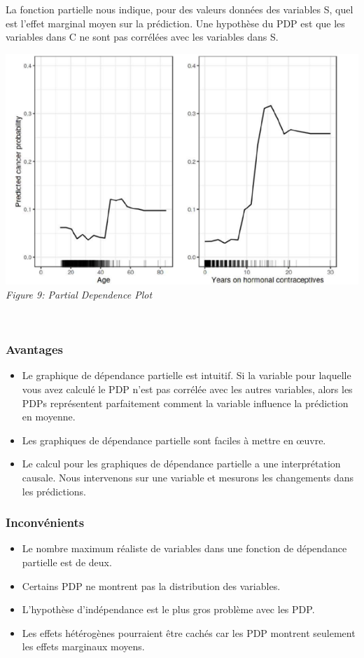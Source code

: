 La fonction partielle nous indique, pour des valeurs données des variables S, quel est l'effet marginal moyen sur la prédiction. Une hypothèse du PDP est que les variables dans C ne sont pas corrélées avec les variables dans S.


\begin{center}
    \centering
    \includegraphics[width=0.7\linewidth]{Images/PDP.png}
    \\
    \emph{Figure 9: Partial Dependence Plot}
    \\
\end{center}
\\

\subsubsection{Avantages}
\begin{itemize}
    \item Le graphique de dépendance partielle est intuitif. Si la variable pour laquelle vous avez calculé le PDP n'est pas corrélée avec les autres variables, alors les PDPs représentent parfaitement comment la variable influence la prédiction en moyenne.
    \item Les graphiques de dépendance partielle sont faciles à mettre en œuvre.
    \item Le calcul pour les graphiques de dépendance partielle a une interprétation causale. Nous intervenons sur une variable et mesurons les changements dans les prédictions.
\end{itemize}

\subsubsection{Inconvénients}
\begin{itemize}
    \item Le nombre maximum réaliste de variables dans une fonction de dépendance partielle est de deux.
    \item Certains PDP ne montrent pas la distribution des variables.
    \item L'hypothèse d'indépendance est le plus gros problème avec les PDP.
    \item Les effets hétérogènes pourraient être cachés car les PDP montrent seulement les effets marginaux moyens.
\end{itemize}


